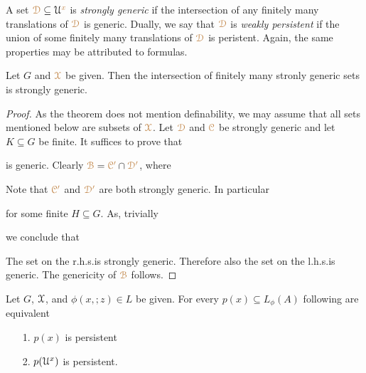 A set ${\color{brown}\EuScript D}\subseteq\EuScript U^{\color{brown} x}$ is \emph{strongly generic\/} if the intersection of any finitely many translations of ${\color{brown}\EuScript D}$ is generic.
Dually, we say that ${\color{brown}\EuScript D}$ is \emph{weakly persistent\/} if the union of some finitely many translations of ${\color{brown}\EuScript D}$ is peristent.
Again, the same properties may be attributed to formulas.




\begin{theorem}\label{thm_generic_invariant}
  Let $G$ and ${\color{brown}\EuScript X}$ be given.
  Then the intersection of finitely many stronly generic sets is strongly generic.
\end{theorem}

\begin{proof}
  As the theorem does not mention definability, we may assume that all sets mentioned below are subsets of ${\color{brown}\EuScript X}$.
  Let ${\color{brown}\EuScript D}$ and ${\color{brown}\EuScript C}$ be strongly generic and let $K\subseteq G$ be finite.
  It suffices to prove that 
  

  is generic. 
  Clearly ${\color{brown}\EuScript B}={\color{brown}\EuScript C'}\cap{\color{brown}\EuScript D'}$, where
  
  

 
  Note that ${\color{brown}\EuScript C'}$ and ${\color{brown}\EuScript D'}$ are both strongly generic.
  In particular
  

  for some finite $H\subseteq G$.
  As, trivially


  we conclude that
  

  The set on the r.h.s.\@ is strongly generic.
  Therefore also the set on the l.h.s.\@ is generic.
  The genericity of ${\color{brown}\EuScript B}$ follows.
\end{proof}


\begin{exercise}\label{ex_persistent_types}
  Let $G$, $\EuScript X$, and $\phi(x,;z)\in L$ be given.
  For every $p(x)\subseteq L_\phi(A)$ following are equivalent
  \begin{itemize}
    \item[1.] $p(x)$ is persistent
    \item[2.] $p(\EuScript U^x)$ is persistent.
  \end{itemize}
\end{exercise}

